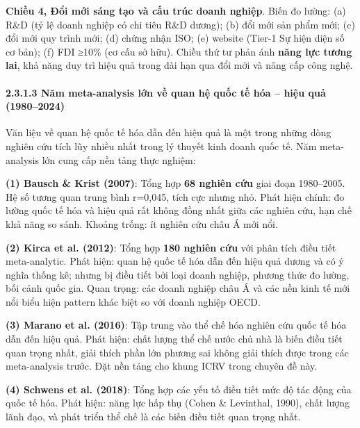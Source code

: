 \documentclass[12pt,a4paper]{article}
\begin{document}
\textbf{Chiều 4, Đổi mới sáng tạo và cấu trúc doanh nghiệp}. Biến đo
lường: (a) R\&D (tỷ lệ doanh nghiệp có chi tiêu R\&D dương); (b) đổi mới
sản phẩm mới; (c) đổi mới quy trình mới; (d) chứng nhận ISO; (e) website
(Tier-1 Sự hiện diện số cơ bản); (f) FDI ≥10\% (cơ cấu sở hữu). Chiều
thứ tư phản ánh \textbf{năng lực tương lai}, khả năng duy trì hiệu quả
trong dài hạn qua đổi mới và nâng cấp công nghệ.

\hypertarget{2313-nux103m-meta-analysis-lux1edbn-vux1ec1-quan-hux1ec7-quux1ed1c-tux1ebf-huxf3a--hiux1ec7u-quux1ea3-19802024}{%
\paragraph{2.3.1.3 Năm meta-analysis lớn về quan hệ quốc tế hóa -- hiệu
quả
(1980--2024)}\label{2313-nux103m-meta-analysis-lux1edbn-vux1ec1-quan-hux1ec7-quux1ed1c-tux1ebf-huxf3a--hiux1ec7u-quux1ea3-19802024}}

Văn liệu về quan hệ quốc tế hóa dẫn đến hiệu quả là một trong những dòng
nghiên cứu tích lũy nhiều nhất trong lý thuyết kinh doanh quốc tế. Năm
meta-analysis lớn cung cấp nền tảng thực nghiệm:

\textbf{(1) Bausch \& Krist (2007)}: Tổng hợp \textbf{68 nghiên cứu}
giai đoạn 1980--2005. Hệ số tương quan trung bình r=0,045, tích cực
nhưng nhỏ. Phát hiện chính: đo lường quốc tế hóa và hiệu quả rất không
đồng nhất giữa các nghiên cứu, hạn chế khả năng so sánh. Khoảng trống:
ít nghiên cứu châu Á mới nổi.

\textbf{(2) Kirca et al. (2012)}: Tổng hợp \textbf{180 nghiên cứu} với
phân tích điều tiết meta-analytic. Phát hiện: quan hệ quốc tế hóa dẫn
đến hiệu quả dương và có ý nghĩa thống kê; nhưng bị điều tiết bởi loại
doanh nghiệp, phương thức đo lường, bối cảnh quốc gia. Quan trọng: các
doanh nghiệp châu Á và các nền kinh tế mới nổi biểu hiện pattern khác
biệt so với doanh nghiệp OECD.

\textbf{(3) Marano et al. (2016)}: Tập trung vào thể chế hóa nghiên cứu
quốc tế hóa dẫn đến hiệu quả. Phát hiện: chất lượng thể chế nước chủ nhà
là biến điều tiết quan trọng nhất, giải thích phần lớn phương sai không
giải thích được trong các meta-analysis trước. Đặt nền tảng cho khung
ICRV trong chuyên đề này.

\textbf{(4) Schwens et al. (2018)}: Tổng hợp các yếu tố điều tiết mức độ
tác động của quốc tế hóa. Phát hiện: năng lực hấp thụ (Cohen \&
Levinthal, 1990), chất lượng lãnh đạo, và phát triển thể chế là các biến
điều tiết quan trọng nhất.
\end{document}
